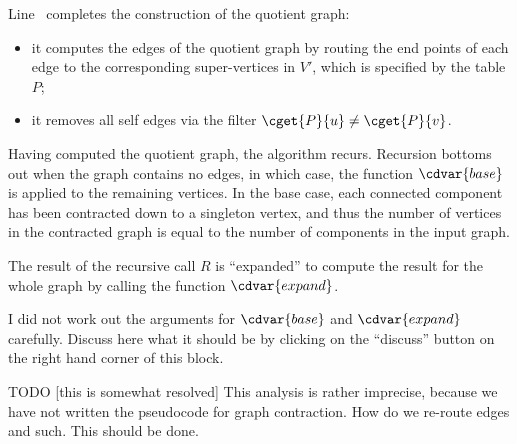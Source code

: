 \begin{algorithm}
Line~\linegcscedges{} completes the construction of the quotient graph:
%
\begin{itemize}
\item it computes the edges of the quotient graph by 
routing the end points of each edge to the corresponding
super-vertices in $V'$, which is specified by the table $P$;
%
\item it  removes all self edges via the  filter $\cget{P}{u}
\neq \cget{P}{v}$.
%
\end{itemize}
%

Having computed the quotient graph, the algorithm recurs.
%
Recursion bottoms out when the graph contains no edges, in which case,
the function $\cdvar{base}$ is applied to the remaining vertices.
%
In the base case, each connected component has been contracted down to
a singleton vertex, and thus the number of vertices in the contracted
graph is equal to the number of components in the input graph.

The result of the recursive call $R$ is ``expanded'' to compute the result
for the whole graph by calling the function $\cdvar{expand}$.

\end{algorithm}

\begin{exercise}
I did not work out the arguments for $\cdvar{base}$ and $\cdvar{expand}$
carefully.  Discuss here what it should be by clicking on the ``discuss''
button on the right hand corner of this block.
\end{exercise}

\begin{teachnote}
TODO [this is somewhat resolved]
This analysis is rather imprecise, because we have not written the
pseudocode for graph contraction.  How do we re-route edges and such.
This should be done.
\end{teachnote}

